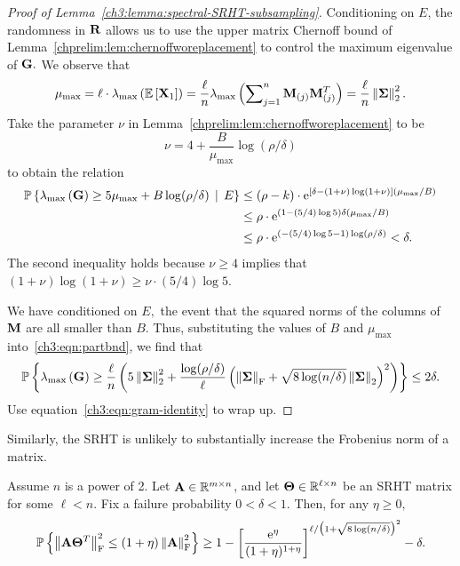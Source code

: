 \begin{proof}[Proof of Lemma~\ref{ch3:lemma:spectral-SRHT-subsampling}]
Conditioning on $E$, the randomness in $\mathbf{R}$ allows us to use the upper matrix 
Chernoff bound of Lemma~\ref{chprelim:lem:chernoffworeplacement} to control the 
maximum eigenvalue of $\mathbf{G}.$ We observe that
\[
 \mu_{\text{max}} = \ell \cdot \lambda_{\mathrm{max}}\left(\mbox{}{\mathbb{E}}\left[\mathbf{X}_1\right]\right) = 
 \frac{\ell}{n} \lambda_{\mathrm{max}}\left(\sum\nolimits_{j=1}^n 
  \mathbf{M}_{(j)} \mathbf{M}_{(j)}^T\right) = \frac{\ell}{n} \left\|\mathbf{\Sigma}\right\|_2^2.
\]
Take the parameter $\nu$ in Lemma~\ref{chprelim:lem:chernoffworeplacement} to be
\[
 \nu = 4 + \frac{B}{\mu_{\text{max}}} \log (\rho/\delta)
\]
to obtain the relation
\begin{align}
 \mathbb{P}\left\{ \lambda_{\mathrm{max}}\left(\mathbf{G}\right) \geq 5 \mu_{\text{max}} + 
 B \log (\rho/\delta)\, \mid\, E \right\} & \leq (\rho-k) \cdot 
  \mathrm{e}^{[\delta - (1+\nu) \log (1 + \nu)] (\mu_{\text{max}}/B) } \notag \\
 & \leq \rho \cdot \mathrm{e}^{(1-(5/4)\log 5) 
   \delta (\mu_{\text{max}}/B)} \notag \\
 & \leq \rho \cdot \mathrm{e}^{(-(5/4)\log 5 -1)
   \log (\rho/\delta)} < \delta. 
\label{ch3:eqn:partbnd}
\end{align}
The second inequality holds because $\nu \geq 4$ implies that 
$(1 + \nu) \log(1+\nu) \geq \nu\cdot (5/4)\log 5 .$

We have conditioned on $E,$ the event that the squared norms of the columns of
$\mathbf{M}$ are all smaller than $B.$ Thus, substituting the values
of $B$ and $\mu_{\text{max}}$ into~\eqref{ch3:eqn:partbnd}, we find that
\[
 \mathbb{P}\left\{ \lambda_{\mathrm{max}}\left(\mathbf{G}\right) \geq \frac{\ell}{n} \left(5 \left\|\mathbf{\Sigma}\right\|_2^2 +
 \frac{\log (\rho/\delta)}{\ell} \left( \left\|\mathbf{\Sigma}\right\|_\mathrm{F} + \sqrt{8 \log(n/\delta)} 
 \left\|\mathbf{\Sigma}\right\|_2 \right)^2 \right) \right\}
\leq 2 \delta.
\]
Use equation~\eqref{ch3:eqn:gram-identity} to wrap up.
\end{proof}


\noindent
Similarly, the SRHT is unlikely to substantially increase the Frobenius norm
of a matrix.
\begin{lemma}
\label{ch3:lemma:frobenius-SRHT-subsampling}
 Assume $n$ is a power of 2. Let $\mathbf{A} \in \mathbb{R}^{m \times n}$, and let $\mathbf{\Theta} \in 
 \mathbb{R}^{\ell \times n}$ be an SRHT matrix for some $\ell < n.$ Fix a failure 
 probability $0 < \delta < 1.$ Then, for any $\eta \geq 0,$
\[
 \Prob{\FNormS{\matA \matTh\transp} \leq (1 + \eta) \FNormS{\matA} } 
 \geq 1- \left[ \frac{\expe^\eta}{(1+\eta)^{1+\eta}} \right]^%
 {\ell/\big(1 + \sqrt{8 \log(n/\delta)}\big)^2} - \delta.
\]
\end{lemma}

